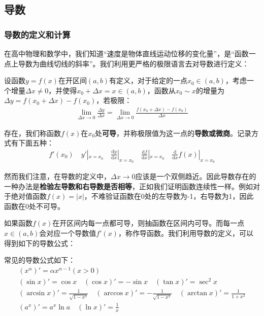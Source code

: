 \documentclass{ctexart}
\let\oldtextbf\textbf %
\renewcommand{\textbf}[1]{\textcolor{btex}{\oldtextbf{#1}}} %
\begin{document}
\subsection{导数}
\subsubsection{导数的定义和计算}
在高中物理和数学中，我们知道“速度是物体直线运动位移的变化量”，是“函数一点上导数为曲线切线的斜率”。我们利用更严格的极限语言去对导数进行定义：
\begin{tcolorbox}[
    colback=bac2,     %
    colframe=fra2,   %
    coltitle=white,             %
    coltext=tex2,
    title=导数的定义,
    fonttitle=\bfseries,        %
arc=3mm,                     %
breakable
]
设函数$y=f(x)$在开区间$(a,b)$有定义，对于给定的一点$x_0\in(a,b)$，考虑一个增量$\Delta x\neq 0$，并使得$x_0+\Delta x=x\in(a,b)$，函数从$x_0\sim x$的增量为$\Delta y=f(x_0+\Delta x)-f(x_0)$，若极限：
\begin{align*}
    \lim_{\Delta x\to 0}\frac{\Delta y}{\Delta x}=\lim_{\Delta x\to 0}\frac{f(x_0+\Delta x)-f(x_0)}{\Delta x}\tag{2-1}
\end{align*}

存在，我们称函数$f(x)$在$x_0$处\textbf{可导}，并称极限值为这一点的\textbf{导数或微商}。记录方式有下面五种：
\begin{align*} 
   f'(x_0)\quad y'|_{x=x_0}\quad \frac{\mathrm{d}y}{\mathrm{d}x}|_{x=x_0} \quad \frac{\mathrm{d}f}
{\mathrm{d}x } |_{x=x_0}\quad \frac{\mathrm{d}}{\mathrm{d}x }f(x) |_{x=x_0}
\end{align*}
\end{tcolorbox}

然而我们注意，在导数的定义中，$\Delta x\to 0$应该是一个双侧趋近。因此导数存在的一种办法是\textbf{检验左导数和右导数是否相等}，正如我们证明函数连续性一样。例如对于绝对值函数$f(x)=|x|$，不难验证函数在$0$处的左导数为-1，右导数为1，因此函数在$0$处不可导。

如果函数$f(x)$在开区间内每一点都可导，则抽函数在区间内可导。而每一点$x\in(a,b)$会对应一个导数值$f'(x)$，称作导函数。我们利用导数的定义，可以得到如下的导数公式：
\begin{tcolorbox}[
    colback=bac1,     %
    colframe=fra1,   %
    coltitle=white,             %
    coltext=tex1,
    title=导数公式,
    fonttitle=\bfseries,        %
arc=3mm,                     %
breakable
]
常见的导数公式如下：
\begin{gather*} 
(x^\alpha)'=\alpha x^{\alpha-1} (x>0)\tag{2-2} \\
(\sin x)'=\cos x \quad (\cos x)'=-\sin x \quad (\tan x)'=\sec^2 x\tag{2-3}\\
(\arcsin x)'=\frac{1}{\sqrt{1-x^2} }\quad (\arccos x)'=-\frac{1}{\sqrt{1-x^2} } \quad
(\arctan x)'=\frac{1}{1+x^2}\tag{2-4}\\
(a^x)'=a^x\ln a\quad (\ln x)'=\frac{1}{x}  \tag{2-5}  
\end{gather*}
\end{tcolorbox}
\end{document}
